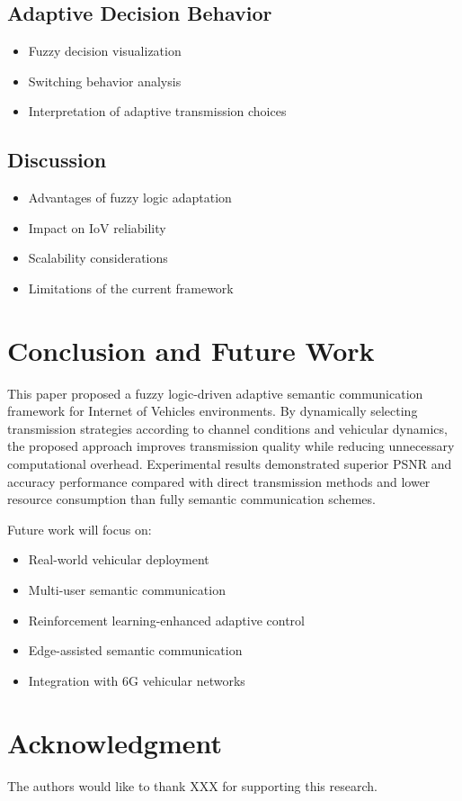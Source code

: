 \documentclass[lettersize,journal]{IEEEtran}
\begin{document}
\subsection{Adaptive Decision Behavior}

\begin{itemize}
    \item Fuzzy decision visualization
    \item Switching behavior analysis
    \item Interpretation of adaptive transmission choices
\end{itemize}

\subsection{Discussion}

\begin{itemize}
    \item Advantages of fuzzy logic adaptation
    \item Impact on IoV reliability
    \item Scalability considerations
    \item Limitations of the current framework
\end{itemize}

\section{Conclusion and Future Work}

This paper proposed a fuzzy logic-driven adaptive semantic communication framework for Internet of Vehicles environments. By dynamically selecting transmission strategies according to channel conditions and vehicular dynamics, the proposed approach improves transmission quality while reducing unnecessary computational overhead. Experimental results demonstrated superior PSNR and accuracy performance compared with direct transmission methods and lower resource consumption than fully semantic communication schemes.

Future work will focus on:
\begin{itemize}
    \item Real-world vehicular deployment
    \item Multi-user semantic communication
    \item Reinforcement learning-enhanced adaptive control
    \item Edge-assisted semantic communication
    \item Integration with 6G vehicular networks
\end{itemize}

\section*{Acknowledgment}

The authors would like to thank XXX for supporting this research.



\end{document}
